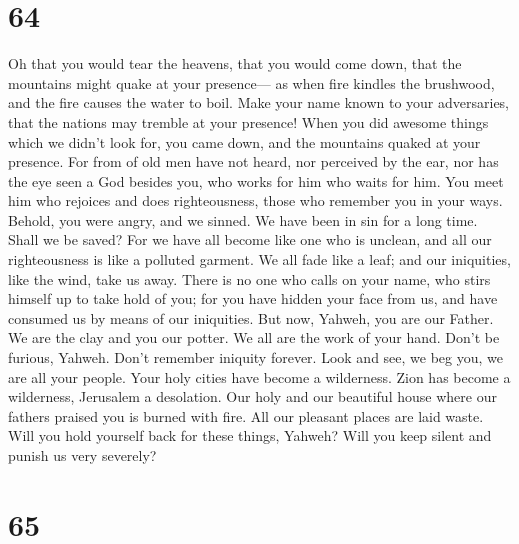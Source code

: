 \hypertarget{section-61}{%
\section{64}\label{section-61}}

 Oh that you would tear the heavens, that you would come
down, that the mountains might quake at your presence--- 
as when fire kindles the brushwood, and the fire causes the water to
boil. Make your name known to your adversaries, that the nations may
tremble at your presence!  When you did awesome things
which we didn't look for, you came down, and the mountains quaked at
your presence.  For from of old men have not heard, nor
perceived by the ear, nor has the eye seen a God besides you, who works
for him who waits for him.  You meet him who rejoices and
does righteousness, those who remember you in your ways. Behold, you
were angry, and we sinned. We have been in sin for a long time. Shall we
be saved?  For we have all become like one who is unclean,
and all our righteousness is like a polluted garment. We all fade like a
leaf; and our iniquities, like the wind, take us away. 
There is no one who calls on your name, who stirs himself up to take
hold of you; for you have hidden your face from us, and have consumed us
by means of our iniquities.  But now, Yahweh, you are our
Father. We are the clay and you our potter. We all are the work of your
hand.  Don't be furious, Yahweh. Don't remember iniquity
forever. Look and see, we beg you, we are all your people.
 Your holy cities have become a wilderness. Zion has
become a wilderness, Jerusalem a desolation.  Our holy
and our beautiful house where our fathers praised you is burned with
fire. All our pleasant places are laid waste.  Will you
hold yourself back for these things, Yahweh? Will you keep silent and
punish us very severely?

\hypertarget{section-62}{%
\section{65}\label{section-62}}

